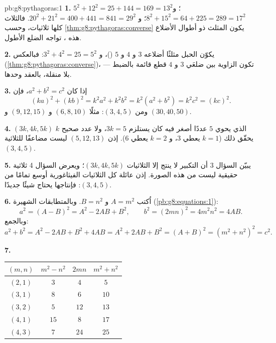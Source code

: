 \begin{solution}{pb:g8:pythagoras:1}
\textbf{1.} $5^2 + 12^2 = 25 + 144 = 169 = 13^2$؛ \quad
و $8^2 + 15^2 = 64 + 225 = 289 = 17^2$؛ \quad
و $20^2 + 21^2 = 400 + 441 = 841 = 29^2$. فالثلاث كلها ثلاثيات،
وحسب \cref{thm:g8:pythagoras:converse} يكون المثلث ذو أطوال
الأضلاع هذه ،  تواجه الضلع
الأطول.

\textbf{2.} يكوّن الحبل مثلثًا أضلاعه $3$ و $4$ و $5$
()، و $3^2 + 4^2 = 25 = 5^2$: فبالعكس
(\cref{thm:g8:pythagoras:converse})، تكون الزاوية بين ضلعَي
$3$ و $4$ قطع قائمة بالضبط --- بلا منقلة،
بالعقد وحدها.

\textbf{3.} إذا كان $a^2 + b^2 = c^2$، فإن
\[
(ka)^2 + (kb)^2 = k^2 a^2 + k^2 b^2
= k^2\left(a^2 + b^2\right) = k^2 c^2 = (kc)^2 .
\]
ومن $(3, 4, 5)$: مثلًا $(6, 8, 10)$ و $(9, 12, 15)$ و
$(30, 40, 50)$.

\textbf{4.}  $(3k, 4k, 5k)$ الذي يحوي $5$ عددًا
أصغر فيه كان يستلزم $3k = 5$، ولا عدد صحيح $k$
يحقّق ذلك ($k = 1$ يعطي $3$، و $k = 2$ يعطي $6$). إذن
$(5, 12, 13)$ ليست مضاعفًا للثلاثية $(3, 4, 5)$.

\textbf{5.} يبيّن السؤال 3 أن التكبير لا ينتج إلا الثلاثيات
$(3k, 4k, 5k)$؛ ويعرض السؤال 4 ثلاثية حقيقية ليست
من هذه الصورة. إذن عائلة كل الثلاثيات الفيثاغورية
أوسع تمامًا من  $(3, 4, 5)$: فإنتاجها
يحتاج شيئًا جديدًا.

\textbf{6.} اُكتب $A = m^2$ و $B = n^2$. وبالمتطابقات
الشهيرة (\cref{pb:g8:equations:1}):
\[
a^2 = (A - B)^2 = A^2 - 2AB + B^2,
\qquad
b^2 = (2mn)^2 = 4m^2n^2 = 4AB .
\]
وبالجمع:
\[
a^2 + b^2 = A^2 - 2AB + B^2 + 4AB
= A^2 + 2AB + B^2 = (A + B)^2
= \left(m^2 + n^2\right)^2 = c^2 .
\]

\textbf{7.}
\begin{center}
\renewcommand{\arraystretch}{1.2}
\begin{tabular}{c|ccc}
$(m, n)$ & $m^2 - n^2$ & $2mn$ & $m^2 + n^2$ \\
\hline
$(2, 1)$ & $3$ & $4$ & $5$ \\
$(3, 1)$ & $8$ & $6$ & $10$ \\
$(3, 2)$ & $5$ & $12$ & $13$ \\
$(4, 1)$ & $15$ & $8$ & $17$ \\
$(4, 3)$ & $7$ & $24$ & $25$ \\
\end{tabular}
\end{center}


\end{solution}
